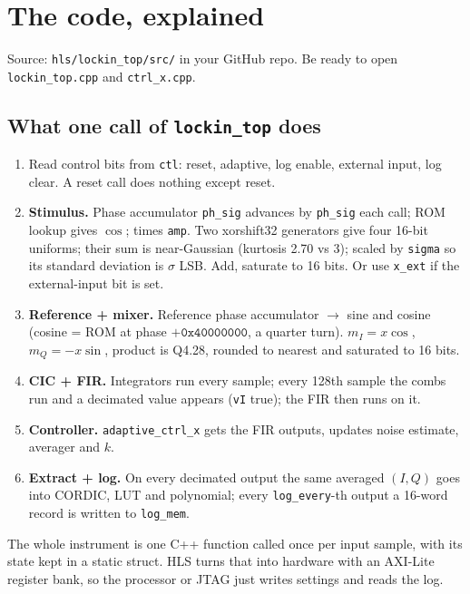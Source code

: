 \documentclass[10pt,a4paper]{article}
\renewcommand{\c}[1]{\texttt{#1}}
\begin{document}
\section{The code, explained}
Source: \c{hls/lockin\_top/src/} in your GitHub repo. Be ready to open \c{lockin\_top.cpp} and \c{ctrl\_x.cpp}.

\subsection{What one call of \texorpdfstring{\c{lockin\_top}}{lockin\_top} does}
\begin{enumerate}
\item Read control bits from \c{ctl}: reset, adaptive, log enable, external input, log clear. A reset call does nothing except reset.
\item \textbf{Stimulus.} Phase accumulator \c{ph\_sig} advances by \c{ph\_sig} each call; ROM lookup gives $\cos$; times \c{amp}. Two xorshift32 generators give four 16-bit uniforms; their sum is near-Gaussian (kurtosis 2.70 vs 3); scaled by \c{sigma} so its standard deviation is $\sigma$ LSB. Add, saturate to 16 bits. Or use \c{x\_ext} if the external-input bit is set.
\item \textbf{Reference + mixer.} Reference phase accumulator $\to$ sine and cosine (cosine = ROM at phase $+\texttt{0x40000000}$, a quarter turn). $m_I=x\cos$, $m_Q=-x\sin$, product is Q4.28, rounded to nearest and saturated to 16 bits.
\item \textbf{CIC + FIR.} Integrators run every sample; every 128th sample the combs run and a decimated value appears (\c{vI} true); the FIR then runs on it.
\item \textbf{Controller.} \c{adaptive\_ctrl\_x} gets the FIR outputs, updates noise estimate, averager and $k$.
\item \textbf{Extract + log.} On every decimated output the same averaged $(I,Q)$ goes into CORDIC, LUT and polynomial; every \c{log\_every}-th output a 16-word record is written to \c{log\_mem}.
\end{enumerate}
\begin{say}
The whole instrument is one C++ function called once per input sample, with its state kept in a static struct. HLS turns that into hardware with an AXI-Lite register bank, so the processor or JTAG just writes settings and reads the log.
\end{say}
\end{document}
